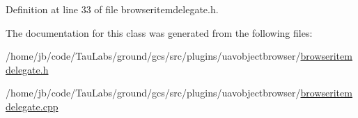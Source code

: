 \-Definition at line 33 of file browseritemdelegate.\-h.



\-The documentation for this class was generated from the following files\-:\begin{DoxyCompactItemize}
\item 
/home/jb/code/\-Tau\-Labs/ground/gcs/src/plugins/uavobjectbrowser/\hyperlink{browseritemdelegate_8h}{browseritemdelegate.\-h}\item 
/home/jb/code/\-Tau\-Labs/ground/gcs/src/plugins/uavobjectbrowser/\hyperlink{browseritemdelegate_8cpp}{browseritemdelegate.\-cpp}\end{DoxyCompactItemize}
